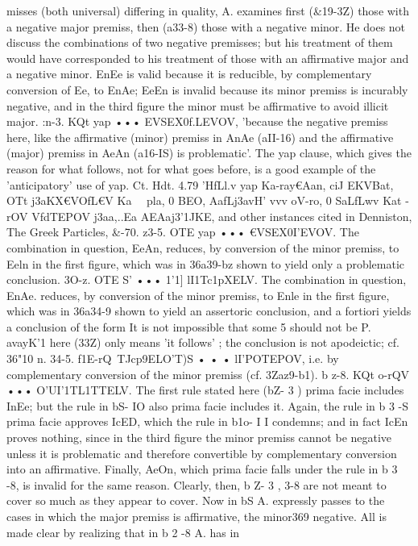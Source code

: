 {{{{{{{{{{{{{misses (both universal) differing in quality, A. examines first
(&19-3Z) those with a negative major premiss, then (a33-8) those
with a negative minor. He does not discuss the combinations
of two negative premisses; but his treatment of them would have
corresponded to his treatment of those with an affirmative major
and a negative minor. EnEe is valid because it is reducible, by
complementary conversion of Ee, to EnAe; EeEn is invalid
because its minor premiss is incurably negative, and in the third
figure the minor must be affirmative to avoid illicit major.
:n-3. KQt yap ••• EVSEX0f.LEVOV, 'because the negative premiss
here, like the affirmative (minor) premiss in AnAe (aII-16) and the
affirmative (major) premiss in AeAn (a16-IS) is problematic'. The
yap clause, which gives the reason for what follows, not for what
goes before, is a good example of the 'anticipatory' use of yap.
Ct. Hdt. 4.79 'HfLl.v yap Ka-ray€Aan, ciJ EKVBat, OTt j3aKX€VOfL€V Ka~
~pla, 0 BEO, AafLj3avH' vvv oV-ro, 0 SaLfLwv Kat -rOV VfdTEPOV j3aa,}..Ea
AEAaj3'1JKE, and other instances cited in Denniston, The Greek
Particles, &}-70.
z3-5. OTE yap ••• €VSEX0I'EVOV. The combination in question,
EeAn, reduces, by conversion of the minor premiss, to Eeln in
the first figure, which was in 36a39-bz shown to yield only a
problematic conclusion.
3O-z. OTE S' ••• 1'1] lI1Tc1pXELV. The combination in question,
EnAe. reduces, by conversion of the minor premiss, to Enle in the
first figure, which was in 36a34-9 shown to yield an assertoric
conclusion, and a fortiori yields a conclusion of the form It is not
impossible that some 5 should not be P. avayK'1} here (33Z) only
means 'it follows' ; the conclusion is not apodeictic; cf. 36"10 n.
34-5. f1E-rQ~TJcp9ELO'T)S • • • lI'POTEPOV, i.e. by complementary
conversion of the minor premiss (cf. 3Zaz9-b1).
b z-8. KQt o-rQV ••• O'UI'1TL1TTELV. The first rule stated here (bZ- 3 )
prima facie includes InEe; but the rule in bS- IO also prima facie
includes it. Again, the rule in b 3 -S prima facie approves IcED,
which the rule in b1o- I I condemns; and in fact IcEn proves
nothing, since in the third figure the minor premiss cannot be
negative unless it is problematic and therefore convertible by
complementary conversion into an affirmative. Finally, AeOn,
which prima facie falls under the rule in b 3 -8, is invalid for the
same reason. Clearly, then, b Z- 3 , 3-8 are not meant to cover so
much as they appear to cover. Now in bS A. expressly passes to
the cases in which the major premiss is affirmative, the minor369
negative. All is made clear by realizing that in b 2 -8 A. has in
}}}}}}}}}}
